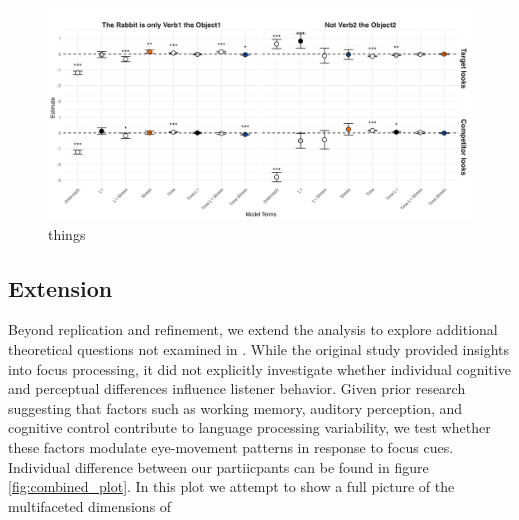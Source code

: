 \begin{figure}[H]  %
    \centering
    \includegraphics[width=\textwidth,height=\textheight,keepaspectratio]{viz/gam_mod_out.png}
    \caption{things}
    \label{fig:gam_mod_out}
\end{figure}

\subsection{Extension}

Beyond replication and refinement, we extend the analysis to explore additional theoretical questions not examined in \citep{Ge2021}. While the original study provided insights into focus processing, it did not explicitly investigate whether individual cognitive and perceptual differences influence listener behavior. Given prior research suggesting that factors such as working memory, auditory perception, and cognitive control contribute to language processing variability, we test whether these factors modulate eye-movement patterns in response to focus cues. Individual difference between our partiicpants can be found in figure \ref{fig:combined_plot}. In this plot we attempt to show a full picture of the multifaceted dimensions of 

